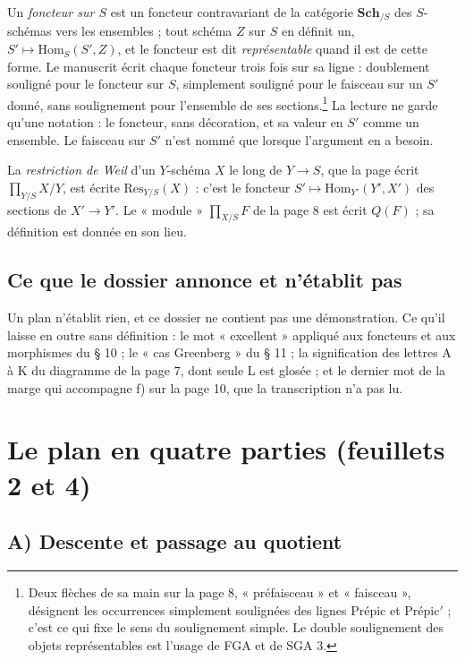 \documentclass[11pt,a4paper]{article}
\begin{document}
Un \emph{foncteur sur $S$} est un foncteur contravariant de la catégorie
$\mathbf{Sch}_{/S}$ des $S$-schémas vers les ensembles ; tout schéma $Z$ sur
$S$ en définit un, $S' \mapsto \mathrm{Hom}_S(S', Z)$, et le foncteur est dit
\emph{représentable} quand il est de cette forme. Le manuscrit écrit chaque
foncteur trois fois sur sa ligne : doublement souligné pour le foncteur sur
$S$, simplement souligné pour le faisceau sur un $S'$ donné, sans soulignement
pour l'ensemble de ses sections.\footnote{Deux flèches de sa main sur la page
8, « préfaisceau » et « faisceau », désignent les occurrences simplement
soulignées des lignes Prépic et Prépic$'$ ; c'est ce qui fixe le sens du
soulignement simple. Le double soulignement des objets représentables est
l'usage de FGA et de SGA 3.} La lecture ne garde qu'une notation : le
foncteur, sans décoration, et sa valeur en $S'$ comme un ensemble. Le faisceau
sur $S'$ n'est nommé que lorsque l'argument en a besoin.

La \emph{restriction de Weil} d'un $Y$-schéma $X$ le long de $Y \to S$, que
la page écrit $\prod_{Y/S} X/Y$, est écrite $\mathrm{Res}_{Y/S}(X)$ : c'est le
foncteur $S' \mapsto \mathrm{Hom}_{Y'}(Y', X')$ des sections de $X' \to Y'$.
Le « module » $\prod_{X/S} F$ de la page 8 est écrit $Q(F)$ ; sa définition
est donnée en son lieu.

\subsection*{Ce que le dossier annonce et n'établit pas}

Un plan n'établit rien, et ce dossier ne contient pas une démonstration. Ce
qu'il laisse en outre sans définition : le mot « excellent » appliqué aux
foncteurs et aux morphismes du § 10 ; le « cas Greenberg » du § 11 ; la
signification des lettres A à K du diagramme de la page 7, dont seule L est
glosée ; et le dernier mot de la marge qui accompagne f) sur la page 10, que
la transcription n'a pas lu.

\section*{Le plan en quatre parties (feuillets 2 et 4)}

\subsection*{A) Descente et passage au quotient}
\end{document}
